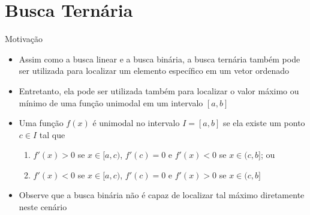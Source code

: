 \section{Busca Ternária}

\begin{frame}[fragile]{Motivação}

    \begin{itemize}
        \item Assim como a busca linear e a busca binária, a busca ternária também
            pode ser utilizada para localizar um elemento específico em um vetor ordenado

        \item Entretanto, ela pode ser utilizada também para localizar o valor máximo ou
            mínimo de uma função unimodal em um intervalo $[a, b]$

        \item Uma função $f(x)$ é unimodal no intervalo $I = [a, b]$ se ela existe um ponto 
            $c\in I$ tal que
            \begin{enumerate}
                \item $f'(x) > 0$ se $x \in[a, c)$, $f'(c) = 0$ e $f'(x) < 0$ se $x\in (c, b]$; ou
                \item $f'(x) < 0$ se $x \in[a, c)$, $f'(c) = 0$ e $f'(x) > 0$ se $x\in (c, b]$
            \end{enumerate}

        \item Observe que a busca binária não é capaz de localizar tal máximo diretamente
            neste cenário
    \end{itemize}

\end{frame}




